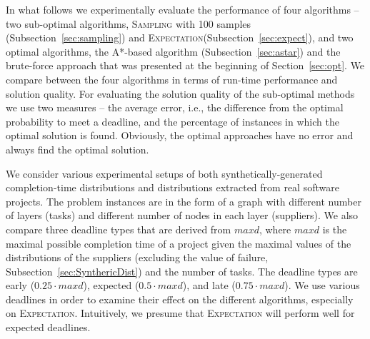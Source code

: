 \documentclass[letterpaper]{article} %
\newcommand{\samd}{\ac{SAMD}\xspace}
\newcommand{\astar}{\textsc{A*}\xspace}
\newcommand{\sampling}{\textsc{Sampling}\xspace}
\newcommand{\expectation}{\textsc{Expectation}\xspace}
\begin{document}
In what follows we experimentally evaluate the performance of four algorithms -- two sub-optimal algorithms, \sampling with 100 samples (Subsection~\ref{sec:sampling}) and \expectation (Subsection~\ref{sec:expect}), and two optimal algorithms, the \astar-based algorithm (Subsection~\ref{sec:astar}) and the brute-force approach that was presented at the beginning of Section~\ref{sec:opt}.
We compare between the four algorithms in terms of run-time performance and solution quality. For evaluating the solution quality of the sub-optimal methods we use two measures -- the average error, i.e., the difference from the optimal probability to meet a deadline, and the percentage of instances in which the optimal solution is found. Obviously, the optimal approaches have no error and always find the optimal solution.  

We consider various experimental setups of both synthetically-generated completion-time distributions and distributions extracted from real software projects. The problem instances are in the form of a graph with different number of layers (tasks) and different number of nodes in each layer (suppliers). We also compare three deadline types that are derived from $maxd$, where $maxd$ is the maximal possible completion time of a project given the maximal values of the distributions of the suppliers (excluding the value of failure, Subsection~\ref{sec:SynthericDist}) and the number of tasks. The deadline types are early ($0.25\cdot maxd$), expected ($0.5\cdot maxd$), and late ($0.75\cdot maxd$). We use various deadlines in order to examine their effect on the different algorithms, especially on \expectation. Intuitively, we presume that \expectation will perform well for expected deadlines.
\end{document}
